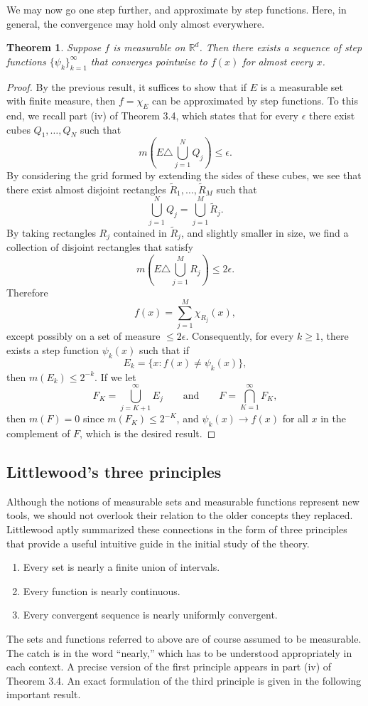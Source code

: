 \documentclass[11pt,openany]{book}
\newtheorem{theorem}{Theorem}[section]
\begin{document}
We may now go one step further, and approximate by step functions. Here, in general, the convergence may hold only almost everywhere.

\begin{theorem}
Suppose $f$ is measurable on $\mathbb{R}^d$. Then there exists a sequence of step functions $\{\psi_k\}_{k=1}^{\infty}$ that converges pointwise to $f(x)$ for almost every $x$.
\end{theorem}

\begin{proof}
By the previous result, it suffices to show that if $E$ is a measurable set with finite measure, then $f=\chi_E$ can be approximated by step functions. To this end, we recall part (iv) of Theorem 3.4, which states that for every $\epsilon$ there exist cubes $Q_1,\ldots,Q_N$ such that
\[
 m\left(E\triangle\bigcup_{j=1}^NQ_j\right)\le\epsilon.
\]
By considering the grid formed by extending the sides of these cubes, we see that there exist almost disjoint rectangles $\widetilde R_1,\ldots,\widetilde R_M$ such that
\[
 \bigcup_{j=1}^NQ_j=\bigcup_{j=1}^M\widetilde R_j.
\]
By taking rectangles $R_j$ contained in $\widetilde R_j$, and slightly smaller in size, we find a collection of disjoint rectangles that satisfy
\[
 m\left(E\triangle\bigcup_{j=1}^M R_j\right)\le2\epsilon.
\]
Therefore
\[
 f(x)=\sum_{j=1}^M\chi_{R_j}(x),
\]
except possibly on a set of measure $\le2\epsilon$. Consequently, for every $k\ge1$, there exists a step function $\psi_k(x)$ such that if
\[
 E_k=\{x:f(x)\ne\psi_k(x)\},
\]
then $m(E_k)\le2^{-k}$. If we let
\[
 F_K=\bigcup_{j=K+1}^{\infty}E_j
 \qquad\text{and}\qquad
 F=\bigcap_{K=1}^{\infty}F_K,
\]
then $m(F)=0$ since $m(F_K)\le2^{-K}$, and $\psi_k(x)\to f(x)$ for all $x$ in the complement of $F$, which is the desired result.
\end{proof}

\subsection{Littlewood's three principles}

Although the notions of measurable sets and measurable functions represent new tools, we should not overlook their relation to the older concepts they replaced. Littlewood aptly summarized these connections in the form of three principles that provide a useful intuitive guide in the initial study of the theory.
\begin{enumerate}
\item[(i)] Every set is nearly a finite union of intervals.
\item[(ii)] Every function is nearly continuous.
\item[(iii)] Every convergent sequence is nearly uniformly convergent.
\end{enumerate}
The sets and functions referred to above are of course assumed to be measurable. The catch is in the word ``nearly,'' which has to be understood appropriately in each context. A precise version of the first principle appears in part (iv) of Theorem 3.4. An exact formulation of the third principle is given in the following important result.
\end{document}
